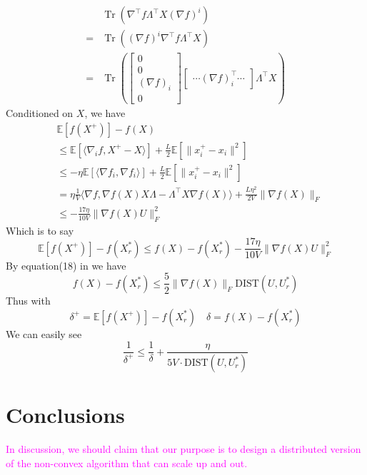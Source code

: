 \documentclass[letterpaper]{article} %
\DeclareMathOperator{\Tr}{Tr} %
\begin{document}
\begin{equation}
	\begin{split}
		&\Tr(\nabla^\top f\Lambda^\top X(\nabla f)^i)\\
		=&\Tr((\nabla f)^i\nabla^\top f\Lambda^\top X)\\
		=&\Tr(
		\begin{bmatrix}
			0 \\0 \\(\nabla f)_i\\0 
		\end{bmatrix}
		\begin{bmatrix}
			\cdots(\nabla f)^\top_i\cdots 
		\end{bmatrix}\Lambda^\top X)
	\end{split}
\end{equation}
Conditioned on $X$, we have
\begin{equation}
\begin{split}
&\mathbb{E}[f(X^+)]-f(X)\\&\le \mathbb{E}[\langle\nabla_i f, X^+-X \rangle]+\frac{L}{2}\mathbb{E}[\|x_i^+-x_i\|^2] \\
&\le -\eta\mathbb{E}[\langle\nabla f_i, \nabla f_i\rangle]+\frac{L}{2}\mathbb{E}[\|x_i^+-x_i\|^2]\\
&=\eta\frac{1}{V}\langle\nabla f, \nabla f(X)X\Lambda-\Lambda^\top X\nabla f(X)\rangle+\frac{L\eta^2}{2V}\|\nabla f(X)\|_F\\
&\le-\frac{17\eta}{10V}\|\nabla f(X)U\|^2_F
\end{split}
\end{equation}
Which is to say
\begin{equation}
 \mathbb{E}[f(X^+)]-f(X_r^*)\le f(X)-f(X_r^*)-\frac{17\eta}{10V}\|\nabla f(X)U\|^2_F
\end{equation}
By equation(18) in \cite{tu2015low} we have 
\begin{equation}
f(X)-f(X_r^*)\le\frac{5}{2}\|\nabla f(X)\|_F\text{DIST}(U,U^*_r)
\end{equation}
Thus with 
$$\delta^+= \mathbb{E}[f(X^+)]-f(X_r^*)\quad \delta=f(X)-f(X_r^*)$$
We can easily see
\begin{equation}
\frac{1}{\delta^+}\le\frac{1}{\delta}+ \frac{\eta}{5V\cdot\text{DIST}(U,U^*_r)}
\end{equation}
\section{Conclusions}
\textcolor{magenta}{In discussion, we should claim that our purpose is to design a distributed version of the non-convex algorithm that can scale up and out.}



\end{document}

